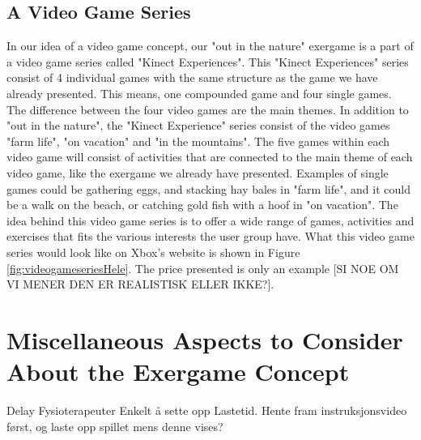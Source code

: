 \subsection{A Video Game Series}
In our idea of a video game concept, our "out in the nature" exergame is a part of a video game series called "Kinect Experiences". This "Kinect Experiences" series consist of 4 individual games with the same structure as the game we have already presented. This means, one compounded game and four single games. The difference between the four video games are the main themes. In addition to "out in the nature", the "Kinect Experience" series consist of the video games "farm life", "on vacation" and "in the mountains". The five games within each video game will consist of activities that are connected to the main theme of each video game, like the exergame we already have presented. Examples of single games could be gathering eggs, and stacking hay bales in "farm life", and it could be a walk on the beach, or catching gold fish with a hoof in "on vacation". The idea behind this video game series is to offer a wide range of games, activities and exercises that fits the various interests the user group have. What this video game series would look like on Xbox's website is shown in Figure \ref{fig:videogameseriesHele}. The price presented is only an example [SI NOE OM VI MENER DEN ER REALISTISK ELLER IKKE?].  



\section{Miscellaneous Aspects to Consider About the Exergame Concept}
\label{sec:misc}

Delay
Fysioterapeuter
Enkelt å sette opp
Lastetid. Hente fram instruksjonsvideo først, og laste opp spillet mens denne vises?
